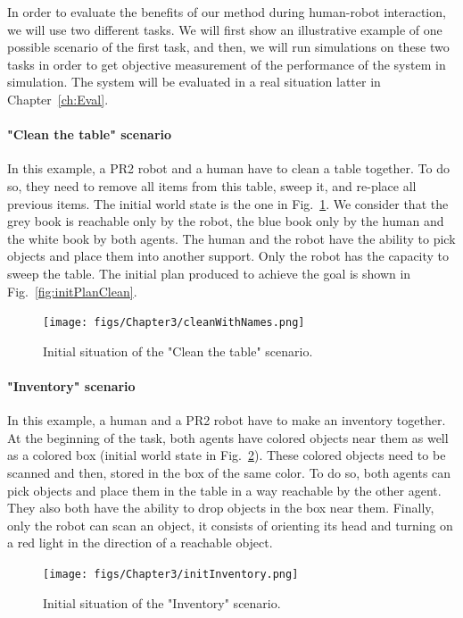 \documentclass[english,a4paper,11pt,twoside]{StyleThese}
\begin{document}
In order to evaluate the benefits of our method during human-robot interaction, we will use two different tasks. We will first show an illustrative example of one possible scenario of the first task, and then, we will run simulations on these two tasks in order to get objective measurement of the performance of the system in simulation. The system will be evaluated in a real situation latter in Chapter~\ref{ch:Eval}.

\paragraph{"Clean the table" scenario}

In this example, a PR2 robot and a human have to clean a table together. To do so, they need to remove all items from this table, sweep it, and re-place all previous items. The initial world state is the one in Fig.~\ref{fig:initClean}. We consider that the grey book is reachable only by the robot, the blue book only by the human and the white book by both agents. The human and the robot have the ability to pick objects and place them into another support. Only the robot has the capacity to sweep the table. The initial plan produced to achieve the goal is shown in Fig.~\ref{fig:initPlanClean}.

\begin{figure}[!h]
	\centering
    \texttt{[image: figs/Chapter3/cleanWithNames.png]}
    \caption{Initial situation of the "Clean the table" scenario.}
    \label{fig:initClean}
\end{figure}

\paragraph{"Inventory" scenario}

In this example, a human and a PR2 robot have to make an inventory together. At the beginning of the task, both agents have colored objects near them as well as a colored box (initial world state in Fig.~\ref{fig:initInventory}). These colored objects need to be scanned and then, stored in the box of the same color. To do so, both agents can pick objects and place them in the table in a way reachable by the other agent. They also both have the ability to drop objects in the box near them. Finally, only the robot can scan an object, it consists of orienting its head and turning on a red light in the direction of a reachable object. 

\begin{figure}[!h]
	\centering
    \texttt{[image: figs/Chapter3/initInventory.png]}
    \caption{Initial situation of the "Inventory" scenario.}
    \label{fig:initInventory}
\end{figure}
\end{document}
